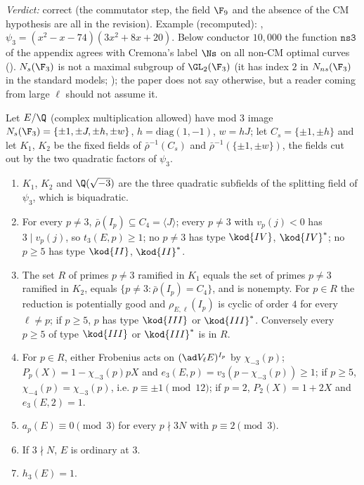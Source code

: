 \begin{sloppypar}
\noindent\emph{Verdict:} correct (the commutator step, the field $\F_9$ and the absence of the CM hypothesis are all in the revision). Example (recomputed): ,
$\psi_3=(x^2-x-74)(3x^2+8x+20)$. Below conductor $10{,}000$ the function $\texttt{ns3}$ of the appendix agrees with Cremona's label $\Ns$ on all non-CM optimal curves ().
$N_s(\F_3)$ is not a maximal subgroup of $\GL_2(\F_3)$ (it has index $2$ in $N_{ns}(\F_3)$ in the standard models; ); the paper does not say otherwise, but a reader coming
from large $\ell$ should not assume it.

\begin{proposition}\label{prop:paper:ns-structure}
Let $E/\Q$ (complex multiplication allowed) have mod $3$ image $N_s(\F_3)=\{\pm1,\pm J,\pm h,\pm w\}$, $h=\mathrm{diag}(1,-1)$, $w=hJ$; let $C_s=\{\pm1,\pm h\}$ and let $K_1$, $K_2$ be the fixed fields of
$\bar\rho^{-1}(C_s)$ and $\bar\rho^{-1}(\{\pm1,\pm w\})$, the fields cut out by the two quadratic factors of $\psi_3$.
\begin{enumerate}[label=(\roman*)]
\item $K_1$, $K_2$ and $\Q(\sqrt{-3})$ are the three quadratic subfields of the splitting field of $\psi_3$, which is biquadratic.
\item For every $p\ne3$, $\bar\rho(I_p)\subseteq C_4=\langle J\rangle$; every $p\ne3$ with $v_p(j)<0$ has $3\mid v_p(j)$, so $t_3(E,p)\ge1$; no $p\ne3$ has type $\kod{IV}$, $\kod{IV}^*$; no $p\ge5$ has type
$\kod{II}$, $\kod{II}^*$.
\item The set $R$ of primes $p\ne3$ ramified in $K_1$ equals the set of primes $p\ne3$ ramified in $K_2$, equals $\{p\ne3:\bar\rho(I_p)=C_4\}$, and is nonempty. For $p\in R$ the reduction is
potentially good and $\rho_{E,\ell}(I_p)$ is cyclic of order $4$ for every $\ell\ne p$; if $p\ge5$, $p$ has type $\kod{III}$ or $\kod{III}^*$. Conversely every $p\ge5$ of type $\kod{III}$ or $\kod{III}^*$ is in $R$.
\item For $p\in R$, either Frobenius acts on $(\ad V_\ell E)^{I_p}$ by $\chi_{-3}(p)$; $P_p(X)=1-\chi_{-3}(p)pX$ and $e_3(E,p)=v_3(p-\chi_{-3}(p))\ge1$; if $p\ge5$, $\chi_{-4}(p)=\chi_{-3}(p)$, i.e.
$p\equiv\pm1\pmod{12}$; if $p=2$, $P_2(X)=1+2X$ and $e_3(E,2)=1$.
\item $a_p(E)\equiv0\pmod3$ for every $p\nmid3N$ with $p\equiv2\pmod3$.
\item If $3\nmid N$, $E$ is ordinary at $3$.
\item $h_3(E)=1$.
\end{enumerate}
\end{proposition}


\end{sloppypar}
